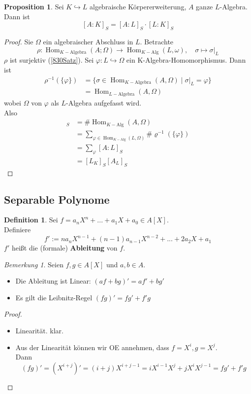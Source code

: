 \documentclass[10pt,a4paper]{article}
\newcommand{\Hom}{\operatorname{Hom}}
\newcounter{thm}[section]
\theoremstyle{definition}
\newtheorem{definition}[thm]{Definition}
\newtheorem{prop}[thm]{Proposition}
\theoremstyle{plain}
\theoremstyle{remark}
\newtheorem*{bem*}{Bemerkung}
\begin{document}
\begin{prop}\label{918prop}
	Sei $K\hookrightarrow L$ algebraische Körpererweiterung, $A$ ganze $L$-Algebra.\\
	Dann ist
	\[[A:K]_S=[A:L]_S\cdot[L:K]_S\]
\end{prop}
\begin{proof}
	Sie $\Omega$ ein algebraischer Abschluss in $L$. Betrachte
	\[\rho:\Hom_{K-\text{Algebra}}(A;\Omega)\rightarrow \Hom_{K-\text{Alg}}(L,\omega),\quad\sigma\mapsto\sigma|_L\]
	$\rho$ ist surjektiv (\ref{830Satz}). Sei $\varphi:L\hookrightarrow \Omega$ ein K-Algebra-Homomorphismus. Dann ist
	\begin{align*}
	\rho^{-1}(\{\varphi\})&=\{\sigma\in\Hom_{K-\text{Algebra}}(A,\Omega)\mid \sigma|_L=\varphi\}\\
	&=\Hom_{L-\text{Algebra}}(A,\Omega)
	\end{align*}
	wobei $\Omega$ von $\varphi$ als $L$-Algebra aufgefasst wird.\\
	Also
	\begin{align*}
	[A:K]_S&=\#\Hom_{K-\text{Alg}}(A,\Omega)\\
	&=\sum_{\varphi\in\Hom_{K-\text{Alg}}(L,\Omega)}\#\varrho^{-1}(\{\varphi\})\\
	&=\sum_{\varphi}[A:L]_S\\
	&=[L_K]_S[A_L]_S
	\end{align*}
\end{proof}


\subsection{Separable Polynome}
\begin{definition}
	Sei $f=a_nX^n+...+a_1X+a_0\in A[X]$.\\
	Definiere \[f':=na_nX^{n-1}+(n-1)a_{n-1}X^{n-2}+...+2a_2X+a_1\]
	$f'$ heißt die (formale) \textbf{Ableitung} von $f$.
\end{definition}
\begin{bem*}
	Seien $f,g\in A[X]$ und $a,b\in A$.
	\begin{itemize}
		\item Die Ableitung ist Linear: $(af+bg)'=af'+bg'$
		\item Es gilt die Leibnitz-Regel $(fg)'=fg'+f'g$
	\end{itemize}
\end{bem*}
\begin{proof}
	\begin{itemize}
		\item Linearität. klar.
		\item Aus der Linearität können wir OE annehmen, dass $f=X^i,g=X^j$.\\
		Dann \[(fg)'=(X^{i+j})'=(i+j)X^{i+j-1}=iX^{i-1}X^j+jX^iX^{j-1}=fg'+f'g\]
	\end{itemize}
\end{proof}
\end{document}

